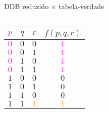 \expandafter\documentclass\expandafter[table, usenames, svgnames, dvipsnames,14pt, \classopts]{beamer}
\begin{document}
\begin{frame}{\uppercase{DDB} reduzido $\times$ tabela-verdade}
\begin{columns}[c]
            \begin{center}
                \small
                \begin{table}
                    \begin{tabular}{ccc|c}
                        \textcolor{magenta}{$p$} & $q$ & $r$ & $f(p,q,r)$\\
                        \hline
                        \textcolor{magenta}{$0$} & $0$ & $0$ & \textcolor{magenta}{$1$}\\
                        \textcolor{magenta}{$0$} & $0$ & $1$ & \textcolor{magenta}{$1$}\\
                        \textcolor{magenta}{$0$} & $1$ & $0$ & \textcolor{magenta}{$1$}\\
                        \textcolor{magenta}{$0$} & $1$ & $1$ & \textcolor{magenta}{$1$}\\
                        $1$ & $0$ & $0$ & $0$\\
                        $1$ & $0$ & $1$ & $0$\\
                        $1$ & $1$ & $0$ & $0$\\
                        $1$ & $1$ & \textcolor{orange}{$1$} & \textcolor{orange}{$1$}\\
                    \end{tabular}
                \end{table}
            \end{center}
    
    \end{columns}
    
\end{frame}
\end{document}
